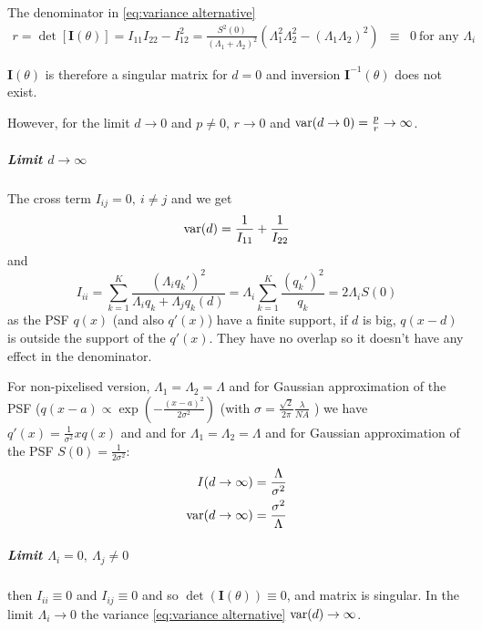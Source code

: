 The denominator in \autoref{eq:variance alternative} 
%
\begin{eqnarray*}
	r=\det\left[\bm{I}(\theta)\right]=I_{11}I_{22}-I_{12}^2=\frac{S^2(0)}{\left(\Lambda_1+\Lambda_2\right)^2}\left(\Lambda_1^2\Lambda_2^2-(\Lambda_1\Lambda_2)^2\right) & \equiv & 0\ \text{for any }\Lambda_i
\end{eqnarray*}

$\bm{I}(\theta)$ is therefore a singular matrix for $d=0$ and inversion $\bm{I}^{-1}(\theta)$ does not exist. 

However, for the limit $d\rightarrow0$ and $p\neq0,\, r\rightarrow0$
and $\mathrm{var}(d\rightarrow0)=\frac{p}{r}\rightarrow\infty$. 

\subparagraph*{Limit $d\rightarrow\infty$}

The cross term $I_{ij}=0,\: i\neq j$ and we get
%
\begin{equation}
	\mathrm{var}(d)=\frac{1}{I_{11}}+\frac{1}{I_{22}}
\end{equation}
%
and 
%
\begin{equation}
	I_{ii}=\sum_{k=1}^K\frac{\left(\Lambda_iq_k'\right)^2}{\Lambda_iq_k+\Lambda_jq_k(d)}=\Lambda_i\sum_{k=1}^K\frac{\left(q_k'\right)^2}{q_k}=2\Lambda_iS(0)
\end{equation}
%
as the PSF $q(x)$ (and also $q'(x)$) have a finite support, if $d$ is big, $q(x-d)$ is outside the support of the $q'(x)$. They have no overlap so it doesn't have any effect in the denominator. 

For non-pixelised version, $\Lambda_1=\Lambda_2=\Lambda$ and for Gaussian approximation of the PSF ($q(x-a)\propto\exp\left(-\frac{(x-a)^2}{2\sigma^2}\right)$ (with $\sigma=\frac{\sqrt{2}}{2\pi}\frac{\lambda}{NA}$ \citep{Zhang2007}) we have $q'(x)=\frac{1}{\sigma^2}xq(x)$ and and for $\Lambda_1=\Lambda_2=\Lambda$ and for Gaussian approximation of the PSF $S(0)=\frac{1}{2\sigma^2}$:
%
\begin{alignat*}{1}
	I(d\rightarrow\infty) & =\frac{\Lambda}{\sigma^2}\\
	\mathrm{var}(d\rightarrow\infty) & =\frac{\sigma^2}{\Lambda}
\end{alignat*}

\subparagraph{Limit $\Lambda_i=0,\ \Lambda_j\neq0$}

then $I_{ii}\equiv0$ and $I_{ij}\equiv0$ and so $\det(\bm{I}(\theta))\equiv0$, and matrix is singular. In the limit $\Lambda_i\rightarrow0$ the variance \autoref{eq:variance alternative} $\mathrm{var}(d)\rightarrow\infty$. 


